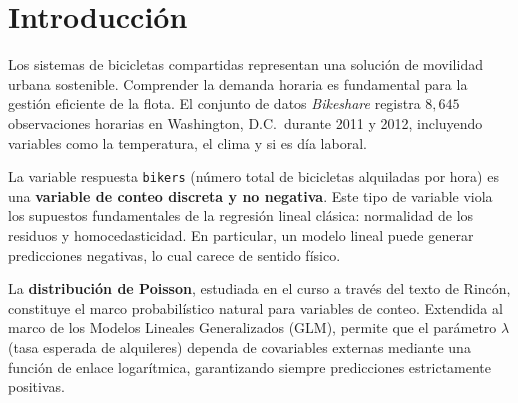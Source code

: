 \documentclass[12pt, a4paper]{article}
\begin{document}
	\begin{abstract}
		En este trabajo se aplica un Modelo Lineal Generalizado (GLM) con distribuci\'on de
		Poisson para predecir el n\'umero de bicicletas alquiladas por hora en el sistema
		\textit{Capital Bikeshare} de Washington, D.C.\ (2011--2012). Se demuestra que la
		Regresi\'on de Poisson supera conceptual y cuantitativamente a la Regresi\'on Lineal
		M\'ultiple cl\'asica, garantizando predicciones positivas y una funci\'on de enlace
		logar\'itmica coherente con la naturaleza discreta de los datos de conteo. Los
		resultados confirman que la hora del d\'ia, las condiciones clim\'aticas y la
		temperatura son los factores determinantes de la demanda.
	\end{abstract}
	
	\tableofcontents
	\newpage
	
	\section{Introducci\'on}
	
	Los sistemas de bicicletas compartidas representan una soluci\'on de movilidad urbana
	sostenible. Comprender la demanda horaria es fundamental para la gesti\'on eficiente
	de la flota. El conjunto de datos \textit{Bikeshare} registra $8{,}645$ observaciones
	horarias en Washington, D.C.\ durante 2011 y 2012, incluyendo variables como la
	temperatura, el clima y si es d\'ia laboral.
	
	La variable respuesta \texttt{bikers} (n\'umero total de bicicletas alquiladas por
	hora) es una \textbf{variable de conteo discreta y no negativa}. Este tipo de
	variable viola los supuestos fundamentales de la regresi\'on lineal cl\'asica:
	normalidad de los residuos y homocedasticidad. En particular, un modelo lineal
	puede generar predicciones negativas, lo cual carece de sentido f\'isico.
	
	La \textbf{distribuci\'on de Poisson}, estudiada en el curso a trav\'es del texto de
	Rinc\'on, constituye el marco probabil\'istico natural para variables de conteo.
	Extendida al marco de los Modelos Lineales Generalizados (GLM), permite que el
	par\'ametro $\lambda$ (tasa esperada de alquileres) dependa de covariables externas
	mediante una funci\'on de enlace logar\'itmica, garantizando siempre predicciones
	estrictamente positivas.
	
\end{document}

